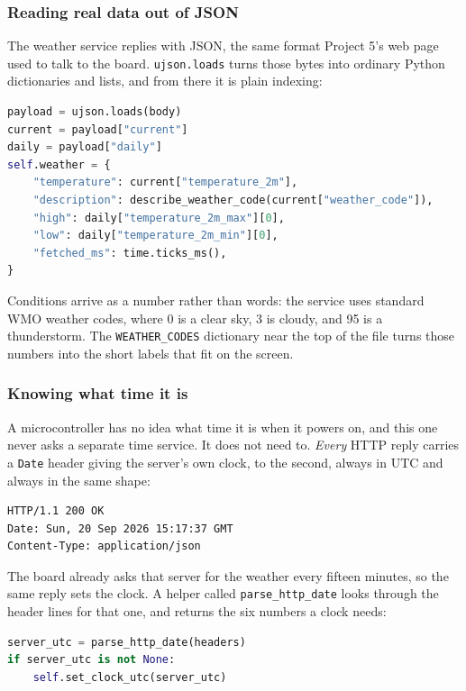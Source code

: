 \subsubsection{Reading real data out of JSON}
The weather service replies with JSON, the same format Project 5's web page used to talk to the
board. \texttt{ujson.loads} turns those bytes into ordinary Python dictionaries and lists, and from
there it is plain indexing:

\begin{lstlisting}[language=Python, caption=Pulling the useful numbers out of the reply]
payload = ujson.loads(body)
current = payload["current"]
daily = payload["daily"]
self.weather = {
    "temperature": current["temperature_2m"],
    "description": describe_weather_code(current["weather_code"]),
    "high": daily["temperature_2m_max"][0],
    "low": daily["temperature_2m_min"][0],
    "fetched_ms": time.ticks_ms(),
}
\end{lstlisting}

Conditions arrive as a number rather than words: the service uses standard WMO weather codes, where
0 is a clear sky, 3 is cloudy, and 95 is a thunderstorm. The \texttt{WEATHER\_CODES} dictionary near
the top of the file turns those numbers into the short labels that fit on the screen.

\subsubsection{Knowing what time it is}
A microcontroller has no idea what time it is when it powers on, and this one never asks a separate
time service. It does not need to. \emph{Every} HTTP reply carries a \texttt{Date} header giving the
server's own clock, to the second, always in UTC and always in the same shape:

\begin{lstlisting}[caption=The start of a real reply from the weather service]
HTTP/1.1 200 OK
Date: Sun, 20 Sep 2026 15:17:37 GMT
Content-Type: application/json
\end{lstlisting}

The board already asks that server for the weather every fifteen minutes, so the same reply sets the
clock. A helper called \texttt{parse\_http\_date} looks through the header lines for that one, and
returns the six numbers a clock needs:

\begin{lstlisting}[language=Python, caption=Taking the time from the weather reply]
server_utc = parse_http_date(headers)
if server_utc is not None:
    self.set_clock_utc(server_utc)
\end{lstlisting}


